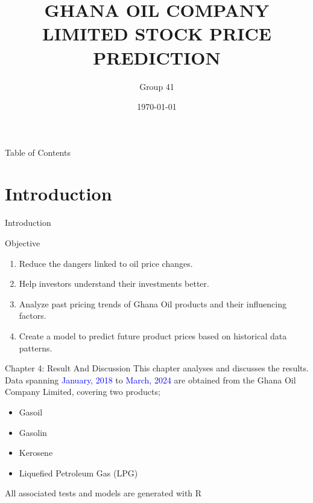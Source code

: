 \documentclass{beamer}
\title{GHANA OIL COMPANY LIMITED STOCK PRICE PREDICTION}
\author{Group 41}
\institute{Kwame Nkrumah University of Science and Technology}
\date{\today}
\newcommand{\colorPrimary}{blue}
\newcommand{\textPrimary}[1]{\textcolor{\colorPrimary}{#1}}
\newcommand{\companyName}{Ghana Oil Company Limited}
\newcommand{\startDate}{January, 2018 }
\newcommand{\finishDate}{March, 2024 }
\begin{document}
	
	\begin{frame}
		\titlepage
	\end{frame}

	\begin{frame}{Table of Contents}
		\tableofcontents
		
	\end{frame}
	
	\section{Introduction}
	\begin{frame}{Introduction}
			\begin{block}{\vspace{5pt} \hspace{5pt} Objective \vspace{5pt}}
				\vspace{5pt}
				\begin{enumerate}[label=\arabic*., leftmargin=2em, itemsep=1em]
					\item Reduce the dangers linked to oil price changes.
					\item Help investors understand their investments better.
					\item Analyze past pricing trends of Ghana Oil products and their influencing factors.
					\item Create a model to predict future product prices based on historical data patterns.
				\end{enumerate}
			\end{block} \vspace{5pt}
	\end{frame}
	\begin{frame}{Chapter 4: Result And Discussion}
		This chapter analyses and discusses the results. \\
		Data spanning \textPrimary{\startDate} to \textPrimary{\finishDate} are obtained from the \companyName, covering two products; 
		 \vspace{5pt}
		
		\begin{itemize}
			\item Gasoil
			\item Gasolin
			\item Kerosene 
			\item Liquefied Petroleum Gas (LPG)
		\end{itemize} \vspace{5pt}
		
		All associated tests and models are generated with R 
	\end{frame}
\end{document}
